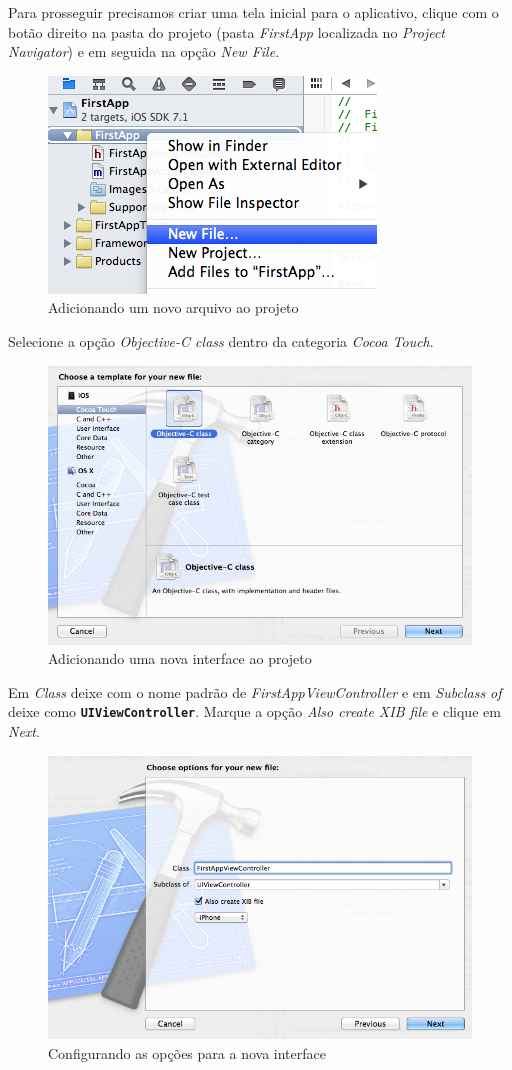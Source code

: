 \documentclass[a4paper,12pt,brazil,doubleside]{book}
\begin{document}
\begin{singlespace}
Para prosseguir precisamos criar uma tela inicial para o aplicativo, clique com o botão direito na pasta do projeto (pasta \emph{FirstApp} localizada no \emph{Project Navigator}) e em seguida na opção \emph{New File}.

\begin{figure}[H]
  \centering
  \includegraphics[width=.35\textwidth]{figuras/3/tela_novo_projeto_6.png}
  \caption{Adicionando um novo arquivo ao projeto}
  \label{fig:a}
\end{figure}


Selecione a opção \emph{Objective-C class} dentro da categoria \emph{Cocoa Touch}.

\begin{figure}[H]
  \centering
  \includegraphics[width=.75\textwidth]{figuras/3/tela_novo_projeto_7.png}
  \caption{Adicionando uma nova interface ao projeto}
  \label{fig:a}
\end{figure}


Em \emph{Class} deixe com o nome padrão de \emph{FirstAppViewController} e em \emph{Subclass of} deixe como \texttt{\textbf{UIViewController}}. Marque a opção \emph{Also create XIB file} e clique em \emph{Next}.

\begin{figure}[H]
  \centering
  \includegraphics[width=.75\textwidth]{figuras/3/tela_novo_projeto_8.png}
  \caption{Configurando as opções para a nova interface}
  \label{fig:a}
\end{figure}



\end{singlespace}
\end{document}
